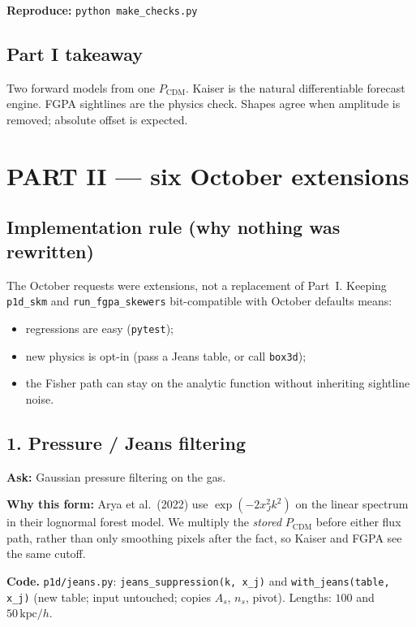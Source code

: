 \documentclass[11pt]{article}
\begin{document}
\textbf{Reproduce:} \texttt{python make\_checks.py}

\subsection{Part I takeaway}

Two forward models from one $P_\mathrm{CDM}$.
Kaiser is the natural differentiable forecast engine.
FGPA sightlines are the physics check.
Shapes agree when amplitude is removed; absolute offset is expected.

\newpage
\section{PART II --- six October extensions}

\subsection{Implementation rule (why nothing was rewritten)}

The October requests were extensions, not a replacement of Part~I.
Keeping \texttt{p1d\_skm} and \texttt{run\_fgpa\_skewers} bit-compatible with October defaults means:
\begin{itemize}
\item regressions are easy (\texttt{pytest});
\item new physics is opt-in (pass a Jeans table, or call \texttt{box3d});
\item the Fisher path can stay on the analytic function without inheriting sightline noise.
\end{itemize}

\subsection{1. Pressure / Jeans filtering}

\textbf{Ask:} Gaussian pressure filtering on the gas.

\textbf{Why this form:} Arya et al.\ (2022) use $\exp(-2 x_J^{2} k^{2})$ on the linear spectrum in their lognormal forest model.
We multiply the \emph{stored} $P_\mathrm{CDM}$ before either flux path, rather than only smoothing pixels after the fact, so Kaiser and FGPA see the same cutoff.

\textbf{Code.}
\texttt{p1d/jeans.py}:
\texttt{jeans\_suppression(k, x\_j)} and \texttt{with\_jeans(table, x\_j)} (new table; input untouched; copies $A_s$, $n_s$, pivot).
Lengths: $100$ and $50\,\mathrm{kpc}/h$.
\end{document}
